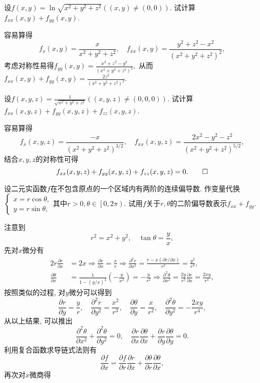 \begin{quiza}
\begin{solution}
\end{solution}
\woe 设\(f(x,y)=\ln\sqrt{x^2+y^2+z^2}\left((x,y)\ne (0,0)\right)\). 试计算\(f_{xx}(x,y)+f_{yy}(x,y)\).
\begin{solution}
容易算得\[f_x(x,y)=\frac{x}{x^2+y^2+z^2},\quad f_{xx}(x,y)=\frac{y^2+z^2-x^2}{\left(x^2+y^2+z^2\right)^2},\]考虑对称性易得\(f_{yy}(x,y)=\frac{x^2+z^2-y^2}{\left(x^2+y^2+z^2\right)^2},\) 从而\(f_{xx}(x,y)+f_{yy}(x,y)=\frac{2z^2}{(x^2+y^2+z^2)^2}.\)
\end{solution}
\woe 设\(f(x,y,z)=\frac{1}{\sqrt{x^2+y^2+z^2}}\left((x,y,z)\ne(0,0,0)\right)\). 试计算\(f_{xx}(x,y,z)+f_{yy}(x,y,z)+f_{zz}(x,y,z)\).
\begin{solution}
容易算得\[f_x(x,y,z)=\frac{-x}{\left(x^2+y^2+z^2\right)^{3/2}},\quad f_{xx}(x,y,z)=\frac{2x^2-y^2-z^2}{(x^2+y^2+z^2)^{5/2}},\]结合\(x,y,z\)的对称性可得\[f_{xx}(x,y,z)+f_{yy}(x,y,z)+f_{zz}(x,y,z)=0.\qedhere\]
\end{solution}
\woe 设二元实函数\(f\)在不包含原点的一个区域内有两阶的连续偏导数. 作变量代换\(\begin{cases}
    x=r\cos\theta,\\y=r\sin\theta,
\end{cases}\)其中\(r>0,\theta\in\left[0,2\pi\right)\). 试用\(f\)关于\(r,\theta\)的二阶偏导数表示\(f_{xx}+f_{yy}\).
\begin{solution}
注意到\[r^2=x^2+y^2,\quad \tan\theta=\frac{y}{x},\]先对\(x\)微分有\[\begin{split}
2r\frac{\partial r}{\partial x}&=2x\Rightarrow\frac{\partial r}{\partial x}=\frac{x}{r}\Rightarrow\frac{\partial^2r}{\partial x^2}=\frac{r-x(\partial r/\partial x)}{r^2}=\frac{y^2}{r^3},\\
\frac{\partial\theta}{\partial x}&=\frac{1}{1-(y/x)^2}\left(-\frac{y}{x^2}\right)=-\frac{y}{r^2}\Rightarrow\frac{\partial^2\theta}{\partial x^2}=\frac{2y}{r^3}\frac{\partial r}{\partial x}=\frac{2xy}{r^4},
\end{split}\]按照类似的过程, 对\(y\)微分可以得到\[\frac{\partial r}{\partial y}=\frac{y}{r},\quad\frac{\partial^2r}{\partial y^2}=\frac{x^2}{r^3},\quad\frac{\partial\theta}{\partial y}=\frac{x}{r^2},\quad\frac{\partial^2\theta}{\partial y^2}=-\frac{2xy}{r^4},\]从以上结果, 可以推出\[\frac{\partial^2\theta}{\partial x^2}+\frac{\partial^2\theta}{\partial y^2}=0,\quad\frac{\partial r}{\partial x}\frac{\partial \theta}{\partial x}+\frac{\partial r}{\partial y}\frac{\partial \theta}{\partial y}=0.\]利用复合函数求导链式法则有\[\frac{\partial f}{\partial x}=\frac{\partial f}{\partial r}\frac{\partial r}{\partial x}+\frac{\partial \theta}{\partial r}\frac{\partial \theta}{\partial x},\]再次对\(x\)微商得\[\begin{split}

\end{split}\]
\end{solution}
\end{quiza}
